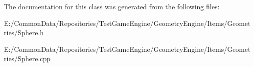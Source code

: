 The documentation for this class was generated from the following files\+:\begin{DoxyCompactItemize}
\item 
E\+:/\+Common\+Data/\+Repositories/\+Test\+Game\+Engine/\+Geometry\+Engine/\+Items/\+Geometries/Sphere.\+h\item 
E\+:/\+Common\+Data/\+Repositories/\+Test\+Game\+Engine/\+Geometry\+Engine/\+Items/\+Geometries/Sphere.\+cpp\end{DoxyCompactItemize}
